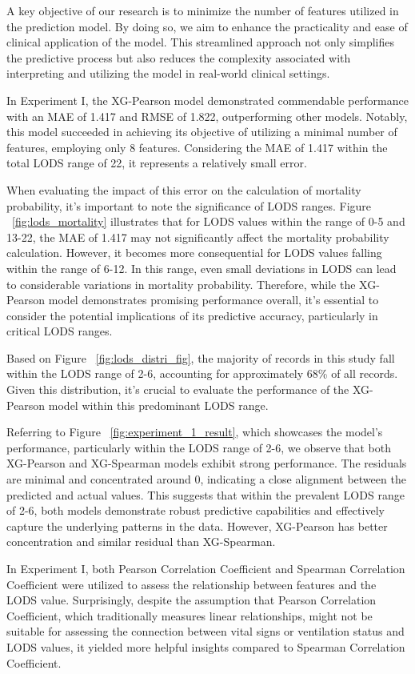 \documentclass[12pt,a4paper,english
]{tunithesis}
\begin{document}
A key objective of our research is to minimize the number of features utilized in the prediction model. By doing so, we aim to enhance the practicality and ease of clinical application of the model. This streamlined approach not only simplifies the predictive process but also reduces the complexity associated with interpreting and utilizing the model in real-world clinical settings.

In Experiment I, the XG-Pearson model demonstrated commendable performance with an MAE of 1.417 and RMSE of 1.822, outperforming other models. Notably, this model succeeded in achieving its objective of utilizing a minimal number of features, employing only 8 features. Considering the MAE of 1.417 within the total LODS range of 22, it represents a relatively small error.

When evaluating the impact of this error on the calculation of mortality probability, it's important to note the significance of LODS ranges. Figure ~\ref{fig:lods_mortality} illustrates that for LODS values within the range of 0-5 and 13-22, the MAE of 1.417 may not significantly affect the mortality probability calculation. However, it becomes more consequential for LODS values falling within the range of 6-12. In this range, even small deviations in LODS can lead to considerable variations in mortality probability. Therefore, while the XG-Pearson model demonstrates promising performance overall, it's essential to consider the potential implications of its predictive accuracy, particularly in critical LODS ranges. 

Based on Figure ~\ref{fig:lods_distri_fig}, the majority of records in this study fall within the LODS range of 2-6, accounting for approximately 68\% of all records. Given this distribution, it's crucial to evaluate the performance of the XG-Pearson model within this predominant LODS range.

Referring to Figure ~\ref{fig:experiment_1_result}, which showcases the model's performance, particularly within the LODS range of 2-6, we observe that both XG-Pearson and XG-Spearman models exhibit strong performance. The residuals are minimal and concentrated around 0, indicating a close alignment between the predicted and actual values. This suggests that within the prevalent LODS range of 2-6, both models demonstrate robust predictive capabilities and effectively capture the underlying patterns in the data. However, XG-Pearson has better concentration and similar residual than XG-Spearman.

In Experiment I, both Pearson Correlation Coefficient and Spearman Correlation Coefficient were utilized to assess the relationship between features and the LODS value. Surprisingly, despite the assumption that Pearson Correlation Coefficient, which traditionally measures linear relationships, might not be suitable for assessing the connection between vital signs or ventilation status and LODS values, it yielded more helpful insights compared to Spearman Correlation Coefficient.
\end{document}
